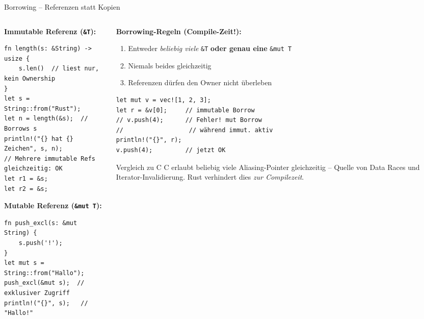 \documentclass[%
  aspectratio=169,
  10pt
]{beamer}
\begin{document}
\begin{frame}[fragile]{Borrowing -- Referenzen statt Kopien}
  \begin{columns}[T]
    \begin{column}{0.50\textwidth}
      \textbf{Immutable Referenz (\texttt{\&T}):}
\begin{lstlisting}
fn length(s: &String) -> usize {
    s.len()  // liest nur, kein Ownership
}
let s = String::from("Rust");
let n = length(&s);  // Borrows s
println!("{} hat {} Zeichen", s, n);
// Mehrere immutable Refs gleichzeitig: OK
let r1 = &s;
let r2 = &s;
\end{lstlisting}
      \textbf{Mutable Referenz (\texttt{\&mut T}):}
\begin{lstlisting}
fn push_excl(s: &mut String) {
    s.push('!');
}
let mut s = String::from("Hallo");
push_excl(&mut s);  // exklusiver Zugriff
println!("{}", s);   // "Hallo!"
\end{lstlisting}
    \end{column}
    \begin{column}{0.47\textwidth}
      \textbf{Borrowing-Regeln (Compile-Zeit!):}
      \small
      \begin{enumerate}
        \item Entweder \emph{beliebig viele} \texttt{\&T}
              \textbf{oder genau eine} \texttt{\&mut T}
        \item Niemals beides gleichzeitig
        \item Referenzen dürfen den Owner nicht überleben
      \end{enumerate}
\begin{lstlisting}
let mut v = vec![1, 2, 3];
let r = &v[0];     // immutable Borrow
// v.push(4);      // Fehler! mut Borrow
//                  // während immut. aktiv
println!("{}", r);
v.push(4);         // jetzt OK
\end{lstlisting}

      \begin{alertblock}{Vergleich zu C}
        \small C erlaubt beliebig viele Aliasing-Pointer
        gleichzeitig -- Quelle von Data Races und
        Iterator-Invalidierung. Rust verhindert
        dies \emph{zur Compilezeit}.
      \end{alertblock}
    \end{column}
  \end{columns}
\end{frame}
\end{document}
